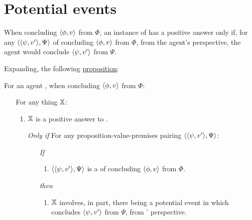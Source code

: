 \section{Potential events}
\label{sec:positive-answers-qzs}

\begin{note}

  When concluding \(\pv{\phi}{v}\) from \(\Phi\), an instance of \qzS{} has a positive answer only if, for any \requ{} \(\pvp{\psi}{v'}{\Psi}\) of concluding \(\pv{\phi}{v}\) from \(\Phi\), from the agent's perspective, the agent would conclude \(\pv{\psi}{v'}\) from \(\Psi\).

  Expanding, the following \hyperref[prop:PWEs]{proposition}:

  \begin{proposition}
    \label{prop:PWEs}
    For an agent \vAgent{}, when concluding \(\pv{\phi}{v}\) from \(\Phi\):

    \begin{itemize}
    \item[]
      For any thing \(\qzSaV{}\):
      \begin{enumerate}[label=\alph*., ref=(\alph*)]
      \item
        \label{prop:PWEs:a}
        \(\qzSaV{}\) is a positive answer to \qzS{}.
      \end{enumerate}
      \begin{itemize}
      \item[\emph{Only if}]
        For any proposition-value-premises pairing \(\pvp{\psi}{v'}{\Psi}\):
        \begin{itemize}
        \item[\emph{If}]
          \begin{enumerate}[label=\alph*., ref=(\alph*), resume]
          \item
            \label{prop:PWEs:b}
            \(\pvp{\psi}{v'}{\Psi}\) is a \requ{} of \vAgent{} concluding \(\pv{\phi}{v}\) from \(\Phi\).
          \end{enumerate}
        \item[\emph{then}]
          \begin{enumerate}[label=\alph*., ref=(\alph*), resume]
          \item
            \label{prop:PWEs:c}
            \(\qzSaV{}\) involves, in part, there being a potential event in which \vAgent{} concludes \(\pv{\psi}{v'}\) from \(\Psi\), from \vAgent{}' perspective.
          \end{enumerate}
        \end{itemize}
      \end{itemize}
    \end{itemize}
  \end{proposition}


\end{note}
